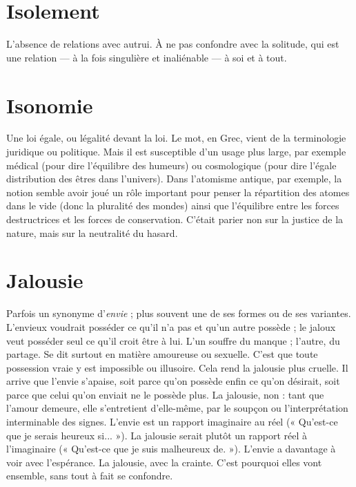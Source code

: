 {\section{Isolement}
L'absence de relations avec autrui. À ne pas confondre avec la
solitude, qui est une relation — à la fois singulière et inaliénable
— à soi et à tout.

\section{Isonomie}
Une loi égale, ou légalité devant la loi. Le mot, en Grec, vient
de la terminologie juridique ou politique. Mais il est susceptible
d’un usage plus large, par exemple médical (pour dire l’équilibre des
humeurs) ou cosmologique (pour dire l’égale distribution des êtres dans l’univers).
Dans l’atomisme antique, par exemple, la notion semble avoir joué un
rôle important pour penser la répartition des atomes dans le vide (donc la pluralité
des mondes) ainsi que l’équilibre entre les forces destructrices et les forces
de conservation. C'était parier non sur la justice de la nature, mais sur la neutralité
du hasard.

\section{Jalousie}
Parfois un synonyme d’{\it envie} ; plus souvent une de ses formes ou
de ses variantes. L’envieux voudrait posséder ce qu’il n’a pas et
qu'un autre possède ; le jaloux veut posséder seul ce qu’il croit être à lui. L'un
souffre du manque ; l’autre, du partage. Se dit surtout en matière amoureuse
ou sexuelle. C’est que toute possession vraie y est impossible ou illusoire.
Cela rend la jalousie plus cruelle. Il arrive que l'envie s’apaise, soit parce
qu'on possède enfin ce qu’on désirait, soit parce que celui qu’on enviait ne le
possède plus. La jalousie, non : tant que l’amour demeure, elle s’entretient
d'elle-même, par le soupçon ou l’interprétation interminable des signes.
L'envie est un rapport imaginaire au réel (« Qu'est-ce que je serais heureux
si... »). La jalousie serait plutôt un rapport réel à l'imaginaire (« Qu’est-ce
que je suis malheureux de. »). L’envie a davantage à voir avec l'espérance.
La jalousie, avec la crainte. C’est pourquoi elles vont ensemble, sans tout à
fait se confondre.

}
